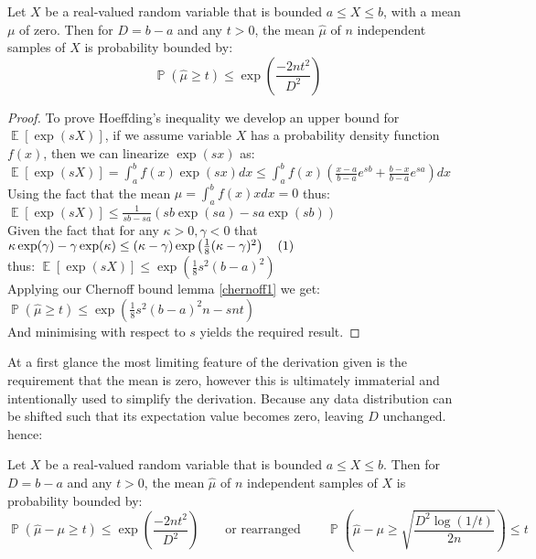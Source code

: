 \documentclass[12pt]{colt2020} %
\DeclareMathOperator{\E}{\mathbb{E}}
\DeclareMathOperator{\p}{\mathbb{P}}
\begin{document}
\begin{theorem}\label{hoeffdings_inequality}
Let $X$ be a real-valued random variable that is bounded $a\le X\le b$, with a mean $\mu$ of zero.  Then for $D=b-a$ and any $t>0$, the mean $\hat{\mu}$ of $n$ independent samples of $X$ is probability bounded by:
\begin{equation}\label{eq_no2}\p(\hat{\mu}\ge t)\le \exp\left(\frac{-2nt^2}{D^2}\right)
\end{equation}
\end{theorem}
\begin{proof}
To prove Hoeffding's inequality we develop an upper bound for $\E[\exp(sX)]$, if we assume variable $X$ has a probability density function $f(x)$, then we can linearize $\exp(sx)$ as:\\
$\E[\exp(sX)] = \int_a^bf(x)\exp(sx)dx \le \int_a^bf(x)\left(\frac{x-a}{b-a}e^{sb} + \frac{b-x}{b-a}e^{sa}\right)dx$\\
Using the fact that the mean $\mu = \int_a^bf(x)xdx = 0$ thus:
$\E[\exp(sX)] \le \frac{1}{sb-sa}\left(sb\exp(sa) - sa\exp(sb) \right)$\\
Given the fact that for any $\kappa>0,\gamma<0$ that
$\kappa\exp(\gamma)-\gamma\exp(\kappa)\le (\kappa-\gamma)\exp\left(\frac{1}{8}(\kappa-\gamma)^2\right) \quad\refstepcounter{equation}(\theequation)\label{Hoeffdings_lemma}$\\
thus:
$\E[\exp(sX)] \le \exp\left(\frac{1}{8}s^2(b-a)^2 \right)$\\
Applying our Chernoff bound lemma \ref{chernoff1} we get:
$ \p(\hat{\mu}\ge t) \le \exp\left(\frac{1}{8}s^2(b-a)^2 n-snt\right) $\\
And minimising with respect to $s$ yields the required result.
\end{proof}

At a first glance the most limiting feature of the derivation given is the requirement that the mean is zero, however this is ultimately immaterial and intentionally used to simplify the derivation. Because any data distribution can be shifted such that its expectation value becomes zero, leaving $D$ unchanged. hence:

\begin{theorem}\label{Hoeffdings_inequality_proper}
Let $X$ be a real-valued random variable that is bounded $a\le X\le b$.  Then for $D=b-a$ and any $t>0$, the mean $\hat{\mu}$ of $n$ independent samples of $X$ is probability bounded by:
\begin{equation}\label{eq_no2}\p(\hat{\mu}-\mu\ge t)\le \exp\left(\frac{-2nt^2}{D^2}\right)\qquad\text{or rearranged}\qquad\p\left(\hat{\mu}-\mu\ge \sqrt{\frac{D^2\log(1/t)}{2n}}\right)\le t
\end{equation}
\end{theorem}
\end{document}
